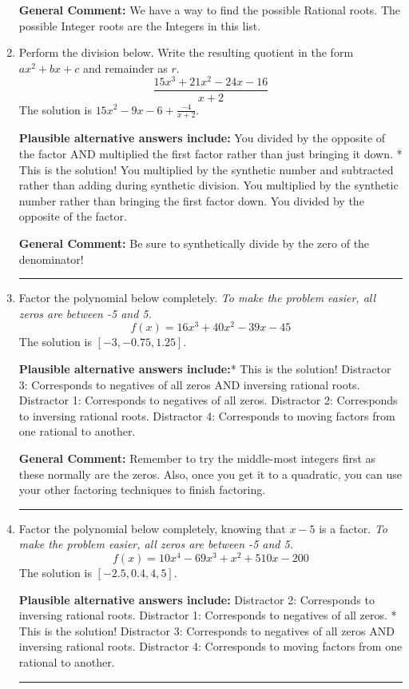 \documentclass{extbook}[14pt]
\newcommand{\litem}[1]{\item #1

\rule{\textwidth}{0.4pt}}
\begin{document}
\begin{enumerate}
{\textbf{General Comment:} We have a way to find the possible Rational roots. The possible Integer roots are the Integers in this list.
}
\litem{
Perform the division below. Write the resulting quotient in the form $ax^2+bx+c$ and remainder as $r$.
\[ \frac{15x^{3} +21 x^{2} -24 x -16}{x + 2} \]The solution is \( 15x^{2} -9 x -6 + \frac{-4}{x + 2} \).\begin{enumerate}[label=\Alph*.]
\textbf{Plausible alternative answers include:} You divided by the opposite of the factor AND multiplied the first factor rather than just bringing it down.
* This is the solution!
 You multiplied by the synthetic number and subtracted rather than adding during synthetic division.
 You multiplied by the synthetic number rather than bringing the first factor down.
 You divided by the opposite of the factor.
\end{enumerate}

\textbf{General Comment:} Be sure to synthetically divide by the zero of the denominator!
}
\litem{
Factor the polynomial below completely. \textit{To make the problem easier, all zeros are between -5 and 5.}
\[ f(x) = 16x^{3} +40 x^{2} -39 x -45 \]The solution is \( [-3, -0.75, 1.25] \).\begin{enumerate}[label=\Alph*.]
\textbf{Plausible alternative answers include:}* This is the solution!
 Distractor 3: Corresponds to negatives of all zeros AND inversing rational roots.
 Distractor 1: Corresponds to negatives of all zeros.
 Distractor 2: Corresponds to inversing rational roots.
 Distractor 4: Corresponds to moving factors from one rational to another.
\end{enumerate}

\textbf{General Comment:} Remember to try the middle-most integers first as these normally are the zeros. Also, once you get it to a quadratic, you can use your other factoring techniques to finish factoring.
}
\litem{
Factor the polynomial below completely, knowing that $x -5$ is a factor. \textit{To make the problem easier, all zeros are between -5 and 5.}
\[ f(x) = 10x^{4} -69 x^{3} + x^{2} +510 x -200 \]The solution is \( [-2.5, 0.4, 4, 5] \).\begin{enumerate}[label=\Alph*.]
\textbf{Plausible alternative answers include:} Distractor 2: Corresponds to inversing rational roots.
 Distractor 1: Corresponds to negatives of all zeros.
* This is the solution!
 Distractor 3: Corresponds to negatives of all zeros AND inversing rational roots.
 Distractor 4: Corresponds to moving factors from one rational to another.
\end{enumerate}

}
\end{enumerate}
\end{document}
